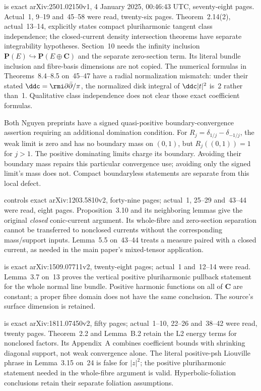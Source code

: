 \cite{Nguyen25IntersectionV1} is exact arXiv:2501.02150v1,
4 January 2025, 00:46:43 UTC, seventy-eight pages. Actual~1, 9--19
and~45--58 were read, twenty-six pages. Theorem~2.14(2), actual~13--14,
explicitly states compact pluriharmonic tangent class independence;
the closed-current density intersection theorems have separate
integrability hypotheses. Section~10 needs the infinity inclusion
$\mathbf P(E)\hookrightarrow\mathbf P(E\oplus\mathbf C)$ and the
separate zero-section term. Its literal bundle inclusion and fibre-basis
dimensions are not copied. The numerical formulas in Theorems~8.4--8.5
on~45--47 have a radial normalization mismatch: under their stated
$\ddc=\rmi\partial\bar\partial/\pi$, the normalized disk integral
of $\ddc|t|^2$ is~2 rather than~1. Qualitative class independence
does not clear those exact coefficient formulas.

Both Nguyen preprints have a signed quasi-positive boundary-convergence
assertion requiring an additional domination condition. For
$R_j=\delta_{1/j}-\delta_{-1/j}$, the weak limit is zero and has no
boundary mass on $(0,1)$, but $R_j((0,1))=1$ for $j>1$.
The positive dominating limits charge its boundary. Avoiding their
boundary mass repairs this particular convergence use; avoiding only
the signed limit's mass does not. Compact boundaryless statements
are separate from this local defect.

\cite{DinhSibony14DensityV2} controls exact
arXiv:1203.5810v2, forty-nine pages; actual~1, 25--29 and~43--44
were read, eight pages. Proposition~3.10 and its neighboring lemmas
give the original \emph{closed} conic-current argument. Its whole-fibre
and zero-section separation cannot be transferred to nonclosed currents
without the corresponding mass/support inputs. Lemma~5.5 on~43--44
treats a measure paired with a closed current, as needed in the main
paper's mixed-tensor application.

\cite{DinhSibony17InvariantCurveV2} is exact
arXiv:1509.07711v2, twenty-eight pages; actual~1 and~12--14 were read.
Lemma~3.7 on~13 proves the vertical positive pluriharmonic pullback
statement for the whole normal line bundle. Positive harmonic functions
on all of $\mathbf C$ are constant; a proper fibre domain does not
have the same conclusion. The source's surface dimension is retained.

\cite{DinhNguyenSibony19SurfaceV2} is exact
arXiv:1811.07450v2, fifty pages; actual~1--10, 22--26 and~38--42
were read, twenty pages. Theorem~2.2 and Lemma~B.2 retain the L2
energy terms for nonclosed factors. Its Appendix~A combines coefficient
bounds with shrinking diagonal support, not weak convergence alone.
The literal positive-psh Liouville phrase in Lemma~3.15 on~24 is false
for $|z|^2$; the positive pluriharmonic statement needed in the
whole-fibre argument is valid. Hyperbolic-foliation conclusions retain
their separate foliation assumptions.

